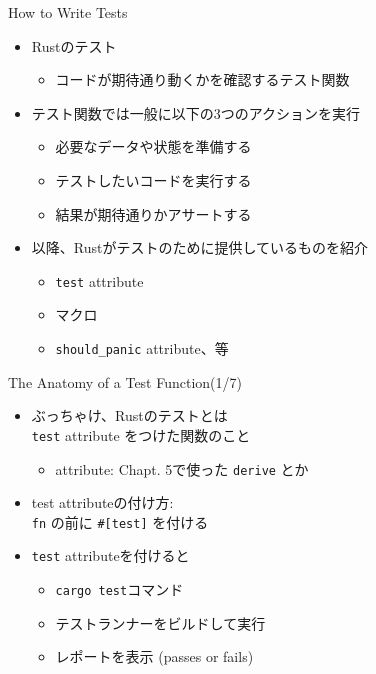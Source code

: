 \documentclass[cjk,14pt,xcolor=dvipsnames,table,dvipdfmx,professional font,t,fragile]{beamer}
\begin{document}
\begin{frame}{How to Write Tests}
 \begin{itemize}
  \item Rustのテスト
	\begin{itemize}
	 \item コードが期待通り動くかを確認するテスト関数
	\end{itemize}
  \item テスト関数では一般に以下の3つのアクションを実行
	\begin{itemize}
	 \item 必要なデータや状態を準備する
	 \item テストしたいコードを実行する
	 \item 結果が期待通りかアサートする
	\end{itemize}
  \item 以降、Rustがテストのために提供しているものを紹介
	\begin{itemize}
	 \item \texttt{test} attribute
	 \item マクロ
	 \item \texttt{should\_panic} attribute、等
	\end{itemize}
 \end{itemize}
\end{frame}

\begin{frame}[fragile]{The Anatomy of a Test Function(1/7)}
 \begin{itemize}
  \item ぶっちゃけ、Rustのテストとは\\
	\texttt{test} attribute をつけた関数のこと
	\begin{itemize}
	 \item attribute: Chapt. 5で使った \texttt{derive} とか
	\end{itemize}
  \item test attributeの付け方: \\
	\hspace{2zw} \texttt{fn} の前に \verb|#[test]| を付ける
  \item \texttt{test} attributeを付けると
	\begin{itemize}
	 \item \texttt{cargo test}コマンド
	 \item テストランナーをビルドして実行
	 \item レポートを表示 (passes or fails)
	\end{itemize}
 \end{itemize}
\end{frame}
\end{document}
